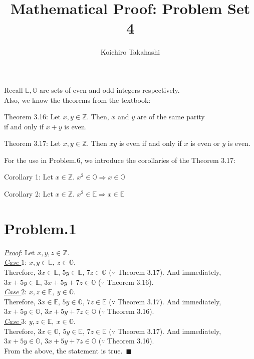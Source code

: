 \documentclass[12pt]{article}
\begin{document}
\title{Mathematical Proof: Problem Set 4}
\author{Koichiro Takahashi}
\maketitle 
Recall $\mathbb{E}, \mathbb{O}$ are sets of even and odd integers respectively.\\
Also, we know the theorems from the textbook:
\begin{center}
Theorem 3.16:
Let $x,y \in \mathbb{Z}$. Then, $x$ and $y$ are of the same parity\\[1em]
if and only if $x+y$ is even.
\end{center}
\begin{center}
Theorem 3.17: Let $x,y \in \mathbb{Z}$. Then $xy$ is even if and only if $x$ is even or $y$ is even.
\end{center}
For the use in Problem.6, we introduce the corollaries of the Theorem 3.17:
\begin{center}
Corollary 1: Let $x \in \mathbb{Z}$. $x^2 \in \mathbb{O} \Rightarrow x \in \mathbb{O}$
\end{center}
\begin{center}
Corollary 2: Let $x \in \mathbb{Z}$. $x^2 \in \mathbb{E} \Rightarrow x \in \mathbb{E}$
\end{center}

\section*{Problem.1}
\underline{\textit{Proof}}: Let $x, y, z \in \mathbb{Z}$.\\[1em]
\underline{\textit{Case $1$}}: $x, y \in \mathbb{E},~z \in \mathbb{O}$.\\
Therefore, $3x \in \mathbb{E}$, $5y \in \mathbb{E}$, $7z \in \mathbb{O}$ ($\because$ Theorem 3.17). And immediately, $3x + 5y \in \mathbb{E}$, $3x + 5y + 7z \in \mathbb{O}$ ($\because$ Theorem 3.16).\\[1em]
\underline{\textit{Case $2$}}: $x, z \in \mathbb{E},~y \in \mathbb{O}$.\\
Therefore, $3x \in \mathbb{E}$, $5y \in \mathbb{O}$, $7z \in \mathbb{E}$ ($\because$ Theorem 3.17). And immediately, $3x + 5y \in \mathbb{O}$, $3x + 5y + 7z \in \mathbb{O}$ ($\because$ Theorem 3.16).\\[1em]
\underline{\textit{Case $3$}}: $y, z \in \mathbb{E},~x \in \mathbb{O}$.\\
Therefore, $3x \in \mathbb{O}$, $5y \in \mathbb{E}$, $7z \in \mathbb{E}$ ($\because$ Theorem 3.17). And immediately, $3x + 5y \in \mathbb{O}$, $3x + 5y + 7z \in \mathbb{O}$ ($\because$ Theorem 3.16).\\[1em]
From the above, the statement is true.~$\blacksquare$
\begin{comment}
By definition,
\begin{gather*}
\exists k, l, m \in \mathbb{Z},~s.t.~ x = 2k,~y = 2l,~z = 2m+1
\end{gather*}
Therefore,
\begin{gather*}
3x + 5y + 7z = 
\end{gather*}
\end{comment}
\end{document}
